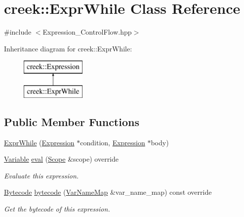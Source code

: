 \hypertarget{classcreek_1_1_expr_while}{}\section{creek\+:\+:Expr\+While Class Reference}
\label{classcreek_1_1_expr_while}


{\ttfamily \#include $<$Expression\+\_\+\+Control\+Flow.\+hpp$>$}

Inheritance diagram for creek\+:\+:Expr\+While\+:\begin{figure}[H]
\begin{center}
\leavevmode
\includegraphics[height=2.000000cm]{classcreek_1_1_expr_while}
\end{center}
\end{figure}
\subsection*{Public Member Functions}
\begin{DoxyCompactItemize}
\item 
\hyperlink{classcreek_1_1_expr_while_abc4b8a929a8a32991e96fc7469d25668}{Expr\+While} (\hyperlink{classcreek_1_1_expression}{Expression} $\ast$condition, \hyperlink{classcreek_1_1_expression}{Expression} $\ast$body)
\item 
\hyperlink{classcreek_1_1_variable}{Variable} \hyperlink{classcreek_1_1_expr_while_a8a58de411d49efa90ccc6e1638964fbb}{eval} (\hyperlink{classcreek_1_1_scope}{Scope} \&scope) override
\begin{DoxyCompactList}\small\item\em Evaluate this expression. \end{DoxyCompactList}\item 
\hyperlink{classcreek_1_1_bytecode}{Bytecode} \hyperlink{classcreek_1_1_expr_while_a63dc722657b7d93f108e1b9ebaa2bf20}{bytecode} (\hyperlink{classcreek_1_1_var_name_map}{Var\+Name\+Map} \&var\+\_\+name\+\_\+map) const  override\hypertarget{classcreek_1_1_expr_while_a63dc722657b7d93f108e1b9ebaa2bf20}{}\label{classcreek_1_1_expr_while_a63dc722657b7d93f108e1b9ebaa2bf20}

\begin{DoxyCompactList}\small\item\em Get the bytecode of this expression. \end{DoxyCompactList}\end{DoxyCompactItemize}


